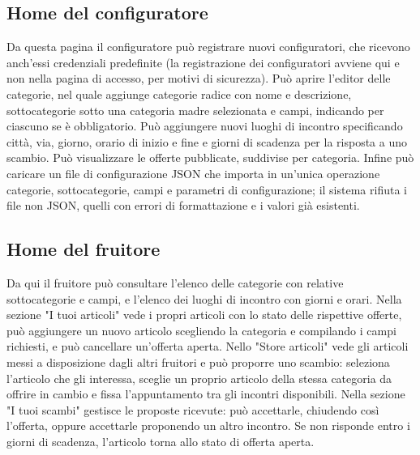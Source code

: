 \subsection{Home del configuratore}
Da questa pagina il configuratore può registrare nuovi configuratori, che ricevono anch'essi credenziali predefinite (la registrazione dei configuratori avviene qui e non nella pagina di accesso, per motivi di sicurezza). Può aprire l'editor delle categorie, nel quale aggiunge categorie radice con nome e descrizione, sottocategorie sotto una categoria madre selezionata e campi, indicando per ciascuno se è obbligatorio. Può aggiungere nuovi luoghi di incontro specificando città, via, giorno, orario di inizio e fine e giorni di scadenza per la risposta a uno scambio. Può visualizzare le offerte pubblicate, suddivise per categoria. Infine può caricare un file di configurazione JSON che importa in un'unica operazione categorie, sottocategorie, campi e parametri di configurazione; il sistema rifiuta i file non JSON, quelli con errori di formattazione e i valori già esistenti.

\subsection{Home del fruitore}
Da qui il fruitore può consultare l'elenco delle categorie con relative sottocategorie e campi, e l'elenco dei luoghi di incontro con giorni e orari. Nella sezione "I tuoi articoli" vede i propri articoli con lo stato delle rispettive offerte, può aggiungere un nuovo articolo scegliendo la categoria e compilando i campi richiesti, e può cancellare un'offerta aperta. Nello "Store articoli" vede gli articoli messi a disposizione dagli altri fruitori e può proporre uno scambio: seleziona l'articolo che gli interessa, sceglie un proprio articolo della stessa categoria da offrire in cambio e fissa l'appuntamento tra gli incontri disponibili. Nella sezione "I tuoi scambi" gestisce le proposte ricevute: può accettarle, chiudendo così l'offerta, oppure accettarle proponendo un altro incontro. Se non risponde entro i giorni di scadenza, l'articolo torna allo stato di offerta aperta.

